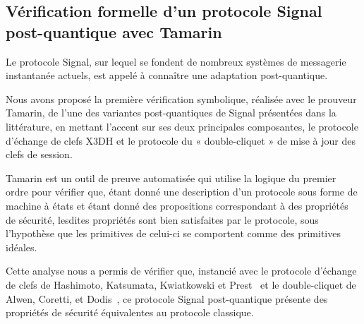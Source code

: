 
\subsection[Second article]{Vérification formelle d’un protocole Signal post-quantique avec Tamarin~\cite{BCRS}} %
\label{sub:paper_2}
Le protocole Signal, sur lequel se fondent de nombreux systèmes de messagerie instantanée actuels, est appelé à connaître une adaptation post-quantique.\par

Nous avons proposé la première vérification symbolique, réalisée avec le prouveur Tamarin, de l’une des variantes post-quantiques de Signal présentées dans la littérature, en mettant l’accent sur ses deux principales composantes, le protocole d’échange de clefs X3DH et le protocole du « double-cliquet » de mise à jour des clefs de session.\par

Tamarin est un outil de preuve automatisée qui utilise la logique du premier ordre pour vérifier que, étant donné une description d’un protocole sous forme de machine à états et étant donné des propositions correspondant à des propriétés de sécurité, lesdites propriétés sont bien satisfaites par le protocole, sous l’hypothèse que les primitives de celui-ci se comportent comme des primitives idéales.\par


Cette analyse nous a permis de vérifier que, instancié avec le protocole d’échange de clefs de Hashimoto, Katsumata, Kwiatkowski et Prest~\cite{PKC:HKKP21} et le double-cliquet de Alwen, Coretti, et Dodis~\cite{EC:AlwCorDod19}, ce protocole Signal post-quantique présente des propriétés de sécurité équivalentes au protocole classique.


